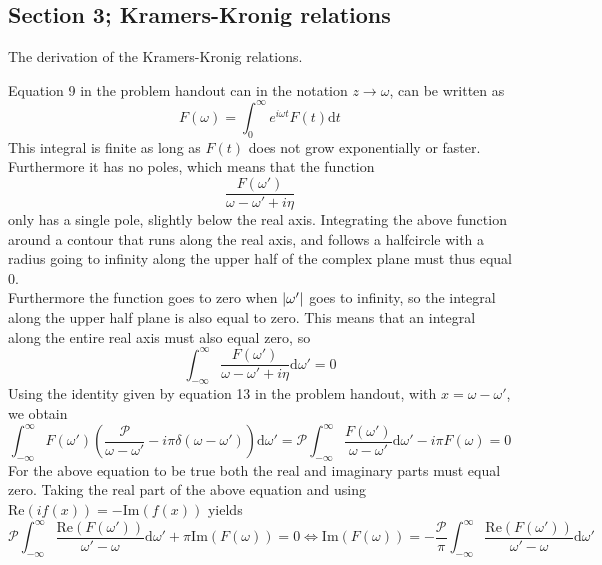 \subsection{Section 3; Kramers-Kronig relations}
\begin{exercise}
The derivation of the Kramers-Kronig relations.
\end{exercise}
\begin{solution}
Equation 9 in the problem handout can in the notation $z \rightarrow \omega$, can be written as
\begin{equation}
    F(\omega) = \int_{0}^{\infty} e^{i \omega t}F(t) \text{d}t
\end{equation}
 This integral is finite as long as $F(t)$ does not grow exponentially or faster.
 Furthermore it has no poles, which means that the function
 \begin{equation}
     \frac{F(\omega')}{\omega - \omega' + i \eta}
 \end{equation}
 only has a single pole, slightly below the real axis. Integrating the above function around a contour that runs along the real axis, and follows a halfcircle with a radius going to infinity along the upper half of the complex plane must thus equal 0. \\
 Furthermore the function goes to zero when $\abs{\omega'}$ goes to infinity, so the integral along the upper half plane is also equal to zero. This means that an integral along the entire real axis must also equal zero, so
 \begin{equation}
     \int_{-\infty}^{\infty} \frac{F(\omega')}{\omega - \omega' + i \eta} \text{d} \omega' = 0
 \end{equation}
 Using the identity given by equation 13 in the problem handout, with $x=\omega-\omega'$, we obtain
 \begin{equation}
     \int_{-\infty}^{\infty} F(\omega') \left(\frac{\mathcal{P}}{\omega-\omega'} - i \pi \delta(\omega-\omega') \right)\text{d}\omega' = \mathcal{P}\int_{-\infty}^{\infty} \frac{F(\omega')}{\omega-\omega'} \text{d} \omega'- i \pi F(\omega)= 0
 \end{equation}
 For the above equation to be true both the real and imaginary parts must equal zero. Taking the real part of the above equation and using $\text{Re}(i f(x)) = -\text{Im}(f(x))$ yields
 \begin{equation}
     \mathcal{P} \int_{-\infty}^{\infty} \frac{\text{Re}(F(\omega'))}{\omega'-\omega} \text{d} \omega' + \pi \text{Im}(F(\omega)) = 0 \Leftrightarrow \text{Im}(F(\omega)) = -\frac{\mathcal{P}}{\pi} \int_{-\infty}^{\infty} \frac{\text{Re}(F(\omega'))}{\omega'-\omega} \text{d} \omega'

\end{equation}
\end{solution}
